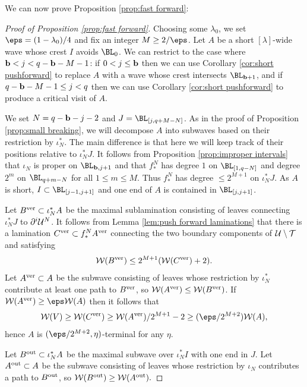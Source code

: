\documentclass[12pt]{amsart}
\begin{document}
We can now prove Proposition \ref{prop:fast forward}:

\begin{proof}[Proof of Proposition \ref{prop:fast forward}]
	Choosing some $\lambda_0$, we set $\eps = (1-\lambda_0)/4$ and fix an  integer $M\geq 2/\eps$.
	Let $A$ be a short $[\lambda]$-wide wave whose crest $I$ avoids $\BL_0$. 
	We can restrict to the case where $\mathbf b< j < q-\mathbf b - M-1$: if $0< j\leq \mathbf b$ then we can use Corollary \ref{cor:short pushforward} to replace $A$ with a wave whose crest intersects $\BL_{\bound+1}$, and if $q-\mathbf b - M-1\leq j < q$ then we can use Corollary \ref{cor:short pushforward}  to produce a critical visit of $A$.
	
	
	We set $N = q-\mathbf b - j -2$ and $J = \BL_{[j, q+M-N]}$. 
	As in the proof of Proposition \ref{prop:small breaking}, we will decompose $A$ into subwaves based on their restriction by $\iota_N^*$. The main difference is that here we will keep track of their positions relative to $\iota_N^*J$. 
	It follows from Proposition  \ref{prop:improper intervals} that $\iota_N$ is proper on $\BL_{\bound, j+1}$ and that $f_*^N$ has degree $1$ on $\BL_{[1, q-N]}$ and degree $2^m$ on $\BL_{q+m-N}$ for all $1\leq m \leq M$. 
	Thus $f_*^N$ has degree $\leq 2^{M+1}$ on $\iota_N^*J$. 		
	As $A$ is short, $I\subset \BL_{[j-1, j+1]}$ and one end of $A$ is contained in $\BL_{[j, j+1]}$. 
	
	
	
	
	
	Let $B^{\mathrm{ver}}\subset \iota_{N}^*A$ be the maximal sublamination consisting of leaves connecting 
	$\iota_N^*J$ to $\partial^i\mathcal U^{N}$.
	It follows from Lemma \ref{lem:push forward laminations} that there is a lamination $C^{\mathrm{ver}}\subset f_*^{N}A^{\mathrm{ver}}$ connecting  the two boundary components of $\mathcal U\setminus \mathcal T$ and satisfying
	$$\mathcal W(B^{\mathrm{ver}})\leq 2^{M+1}(\mathcal W(C^{\mathrm{ver}})+2).$$
	Let $A^{\mathrm{ver}}\subset A$ be the subwave consisting of leaves whose restriction by $\iota_N^*$ contribute at least one path to $B^{\mathrm{ver}}$, 
	so $\mathcal W(A^{\mathrm{ver}})\leq \mathcal W(B^{\mathrm{ver}})$. If 
	$\WW(A^\ver)\geq \eps \WW(A)$ then it follows that 
	$$\WW(V)\geq \WW(C^\ver)\geq \WW(A^\ver)/2^{M+1}-2\geq (\eps/2^{M+2})\WW(A),$$
	hence $A$ is $(\eps /2^{M+2}, \eta)$-terminal 
	for any $\eta$. 
	
	
	
	Let $B^{\operatorname{out}}\subset \iota_{N}^*A$ be the maximal subwave over $\iota_{N}^*I$ with one end in $J.$
	Let $A^{\operatorname{out}}\subset A$ be the  subwave consisting of leaves whose restriction by $\iota_{N}$ contributes a path to $B^{\operatorname{out}}$, so $\mathcal W(B^{\operatorname{out}})\geq \mathcal W(A^{\operatorname{out}}).$
	

\end{proof}
\end{document}
